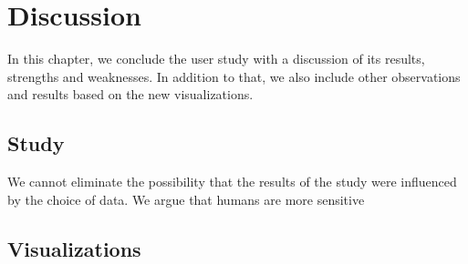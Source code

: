 \chapter{Discussion}

In this chapter, we conclude the user study with a discussion of its results, strengths and weaknesses. In addition to that, we also include other observations and results based on the new visualizations.

\section{Study}

We cannot eliminate the possibility that the results of the study were influenced by the choice of data. We argue that humans are more sensitive 

\section{Visualizations}